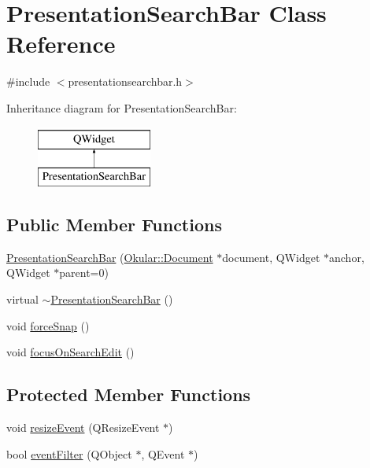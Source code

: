 \hypertarget{classPresentationSearchBar}{\section{Presentation\+Search\+Bar Class Reference}
\label{classPresentationSearchBar}
}


{\ttfamily \#include $<$presentationsearchbar.\+h$>$}

Inheritance diagram for Presentation\+Search\+Bar\+:\begin{figure}[H]
\begin{center}
\leavevmode
\includegraphics[height=2.000000cm]{classPresentationSearchBar}
\end{center}
\end{figure}
\subsection*{Public Member Functions}
\begin{DoxyCompactItemize}
\item 
\hyperlink{classPresentationSearchBar_a6ab83bd9df885cd0280a57ca9d9fbc21}{Presentation\+Search\+Bar} (\hyperlink{classOkular_1_1Document}{Okular\+::\+Document} $\ast$document, Q\+Widget $\ast$anchor, Q\+Widget $\ast$parent=0)
\item 
virtual \hyperlink{classPresentationSearchBar_ab64c2700b07cb6e16f6290306f660d3f}{$\sim$\+Presentation\+Search\+Bar} ()
\item 
void \hyperlink{classPresentationSearchBar_a2721abf1ed64273bca7aa8e324e9bf8c}{force\+Snap} ()
\item 
void \hyperlink{classPresentationSearchBar_a0ecb08c124952d0747f2478d918ddc97}{focus\+On\+Search\+Edit} ()
\end{DoxyCompactItemize}
\subsection*{Protected Member Functions}
\begin{DoxyCompactItemize}
\item 
void \hyperlink{classPresentationSearchBar_a76f9c60b9a4f7edb248488cb61b9d5ed}{resize\+Event} (Q\+Resize\+Event $\ast$)
\item 
bool \hyperlink{classPresentationSearchBar_ad687f7a3dd757c506d8e8578cce6bed2}{event\+Filter} (Q\+Object $\ast$, Q\+Event $\ast$)
\end{DoxyCompactItemize}


